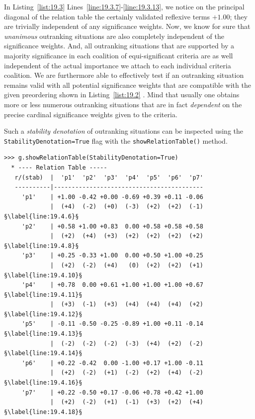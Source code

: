 In Listing~\vref{list:19.3} Lines~\ref{line:19.3.7}-\ref{line:19.3.13}, we notice on the principal diagonal of the relation table the certainly validated reflexive terms $+1.00$; they are trivially independent of any significance weights. Now, we know for sure that \emph{unanimous} outranking situations are also completely independent of the significance weights. And, all outranking situations that are supported by a majority significance in each coalition of equi-significant criteria are as well independent of the actual importance we attach to each individual criteria coalition. We are furthermore able to effectively test if an outranking situation remains valid with all potential significance weights that are compatible with the given preordering shown in Listing~\vref{list:19.2} \citep{BIS-2014}. Mind that usually one obtains more or less numerous outranking situations that are in fact \emph{dependent} on the precise cardinal significance weights given to the criteria.

Such a \emph{stability denotation} of outranking situations can be inspected using the \texttt{StabilityDenotation=True} flag  with the \texttt{showRelation\-Table()} method.
\begin{lstlisting}[caption={Bipolar-valued outranking relation table with stability denotation},label=list:19.4]
>>> g.showRelationTable(StabilityDenotation=True)
  * ---- Relation Table -----
   r/(stab)  |  'p1'  'p2'  'p3'  'p4'  'p5'  'p6'  'p7'   
   ----------|------------------------------------------
     'p1'    | +1.00 -0.42 +0.00 -0.69 +0.39 +0.11 -0.06  
             |  (+4)  (-2)  (+0)  (-3)  (+2)  (+2)  (-1)  §\label{line:19.4.6}§
     'p2'    | +0.58 +1.00 +0.83  0.00 +0.58 +0.58 +0.58  
             |  (+2)  (+4)  (+3)  (+2)  (+2)  (+2)  (+2)  §\label{line:19.4.8}§
     'p3'    | +0.25 -0.33 +1.00  0.00 +0.50 +1.00 +0.25  
             |  (+2)  (-2)  (+4)   (0)  (+2)  (+2)  (+1)  §\label{line:19.4.10}§
     'p4'    | +0.78  0.00 +0.61 +1.00 +1.00 +1.00 +0.67  §\label{line:19.4.11}§
             |  (+3)  (-1)  (+3)  (+4)  (+4)  (+4)  (+2)  §\label{line:19.4.12}§
     'p5'    | -0.11 -0.50 -0.25 -0.89 +1.00 +0.11 -0.14  §\label{line:19.4.13}§
             |  (-2)  (-2)  (-2)  (-3)  (+4)  (+2)  (-2)  §\label{line:19.4.14}§
     'p6'    | +0.22 -0.42  0.00 -1.00 +0.17 +1.00 -0.11
             |  (+2)  (-2)  (+1)  (-2)  (+2)  (+4)  (-2)  §\label{line:19.4.16}§
     'p7'    | +0.22 -0.50 +0.17 -0.06 +0.78 +0.42 +1.00  
             |  (+2)  (-2)  (+1)  (-1)  (+3)  (+2)  (+4)  §\label{line:19.4.18}§
\end{lstlisting}

